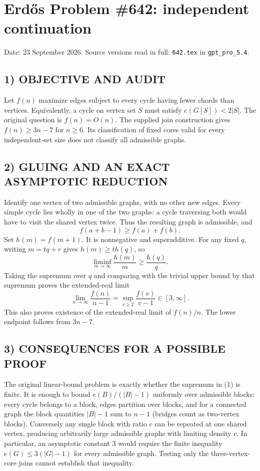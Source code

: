 \section{Erd\H{o}s Problem \#642: independent continuation}
\noindent Date: 23 September 2026. Source versions read in full: \texttt{642.tex} in \texttt{gpt\_pro\_5.4}.

\subsection*{1) OBJECTIVE AND AUDIT}
Let $f(n)$ maximize edges subject to every cycle having fewer chords than vertices. Equivalently, a cycle on vertex set $S$ must satisfy $e(G[S])<2|S|$. The original question is $f(n)=O(n)$. The supplied join construction gives $f(n)\ge3n-7$ for $n\ge6$. Its classification of fixed cores valid for every independent-set size does not classify all admissible graphs.
\subsection*{2) GLUING AND AN EXACT ASYMPTOTIC REDUCTION}
Identify one vertex of two admissible graphs, with no other new edges. Every simple cycle lies wholly in one of the two graphs: a cycle traversing both would have to visit the shared vertex twice. Thus the resulting graph is admissible, and
\[
f(a+b-1)\ge f(a)+f(b).
\]
Set $h(m)=f(m+1)$. It is nonnegative and superadditive. For any fixed $q$, writing $m=tq+r$ gives $h(m)\ge t h(q)$, so
\[
\liminf_{m\to\infty}\frac{h(m)}m\ge\frac{h(q)}q.
\]
Taking the supremum over $q$ and comparing with the trivial upper bound by that supremum proves the extended-real limit
\[
\boxed{\lim_{n\to\infty}\frac{f(n)}{n-1}
=\sup_{v\ge2}\frac{f(v)}{v-1}\in[3,\infty].} \tag{1}
\]
This also proves existence of the extended-real limit of $f(n)/n$. The lower endpoint follows from $3n-7$.
\subsection*{3) CONSEQUENCES FOR A POSSIBLE PROOF}
The original linear-bound problem is exactly whether the supremum in (1) is finite. It is enough to bound $e(B)/(|B|-1)$ uniformly over admissible blocks: every cycle belongs to a block, edges partition over blocks, and for a connected graph the block quantities $|B|-1$ sum to $n-1$ (bridges count as two-vertex blocks). Conversely any single block with ratio $c$ can be repeated at one shared vertex, producing arbitrarily large admissible graphs with limiting density $c$.
In particular, an asymptotic constant $3$ would require the finite inequality $e(G)\le3(|G|-1)$ for every admissible graph. Testing only the three-vertex-core joins cannot establish that inequality.
